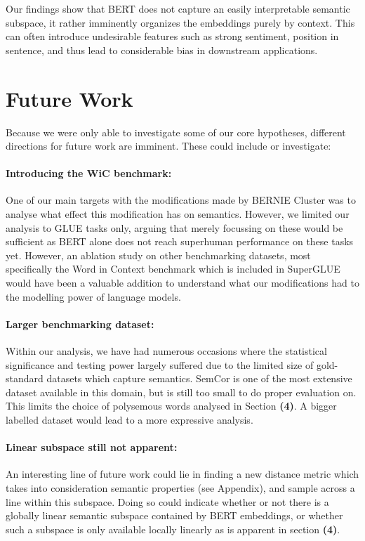 \documentclass[a4paper,12pt,oneside,openright]{report}
\begin{document}
Our findings show that BERT does not capture an easily interpretable semantic subspace, it rather imminently organizes the embeddings purely by context.
This can often introduce undesirable features such as strong sentiment, position in sentence, and thus lead to considerable bias in downstream applications.

\section{Future Work}

Because we were only able to investigate some of our core hypotheses, different directions for future work are imminent.
These could include or investigate:

\paragraph{Introducing the WiC benchmark:} One of our main targets with the modifications made by BERNIE Cluster was to analyse what effect this modification has on semantics.
However, we limited our analysis to GLUE tasks only, arguing that merely focussing on these would be sufficient as BERT alone does not reach superhuman performance on these tasks yet.
However, an ablation study on other benchmarking datasets, most specifically the Word in Context benchmark which is included in SuperGLUE would have been a valuable addition to understand what our modifications had to the modelling power of language models.

\paragraph{Larger benchmarking dataset:} Within our analysis, we have had numerous occasions where the statistical significance and testing power largely suffered due to the limited size of gold-standard datasets which capture semantics.
SemCor is one of the most extensive dataset available in this domain, but is still too small to do proper evaluation on.
This limits the choice of polysemous words analysed in Section \textbf{(4)}.
A bigger labelled dataset would lead to a more expressive analysis.

\paragraph{Linear subspace still not apparent:} An interesting line of future work could lie in finding a new distance metric which takes into consideration semantic properties (see Appendix), and sample across a line within this subspace. 
Doing so could indicate  whether or not there is a globally linear semantic subspace contained by BERT embeddings, or whether such a subspace is only available locally linearly as is apparent in section \textbf{(4)}.
\end{document}
